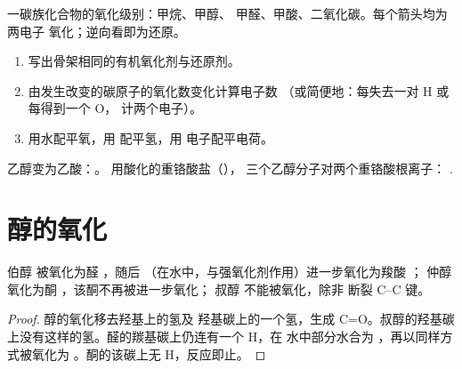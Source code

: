 \begin{omfigure}

{\small 一碳族化合物的氧化级别：甲烷、甲醇、
甲醛、甲酸、二氧化碳。每个箭头均为两电子
氧化；逆向看即为还原。}
\end{omfigure}

\begin{method}[有机半反应式的配平]\label{met:b1:organic-redox:balance-organic-redox}
\begin{enumerate}
  \item 写出骨架相同的有机氧化剂与还原剂。
  \item 由发生改变的碳原子的氧化数变化计算电子数
        （或简便地：每失去一对 H 或每得到一个 O，
        计两个电子）。
  \item 用水配平氧，用  配平氢，用
        电子配平电荷。
\end{enumerate}
乙醇变为乙酸：。
用酸化的重铬酸盐（），
三个乙醇分子对两个重铬酸根离子：
.
\end{method}

\section{醇的氧化}

\begin{proposition}[醇被氧化后的产物]\label{prop:b1:organic-redox:alcohol-oxidation}
伯醇  被氧化为醛 ，随后
（在水中，与强氧化剂作用）进一步氧化为羧酸 ；
仲醇  氧化为酮 ，该酮不再被进一步氧化；
叔醇  不能被氧化，除非
断裂 C--C 键。
\end{proposition}

\begin{proof}
醇的氧化移去羟基上的氢及
羟基碳上的一个氢，生成 C=O。叔醇的羟基碳
上没有这样的氢。醛的羰基碳上仍连有一个 H，在
水中部分水合为 ，再以同样方式被氧化为
。酮的该碳上无 H，反应即止。
\end{proof}

